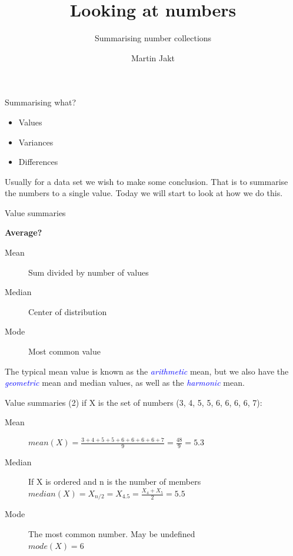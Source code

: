 \documentclass[pdf]{beamer}
\title{Looking at numbers}
\subtitle{Summarising number collections}
\author{Martin Jakt}
\begin{document}
\begin{frame}
\titlepage
\end{frame}

\begin{frame}{Summarising what?}
  \begin{itemize}
  \item Values
  \item Variances
  \item Differences
  \end{itemize}

  Usually for a data set we wish to make some conclusion. That is to
  summarise the numbers to a single value. Today we will start to look
  at how we do this.
\end{frame}

\begin{frame}{Value summaries}

{
\bfseries{Average?}
}

\begin{description}
\item[Mean] \pause Sum divided by number of values
\item[Median] \pause Center of distribution
\item[Mode] \pause Most common value
\end{description}

\pause
The typical mean value is known as the \textcolor{blue}{\emph{arithmetic}} mean,
but we also have the \textcolor{blue}{\emph{geometric}} mean and median values,
as well as the \textcolor{blue}{\emph{harmonic}} mean.

\end{frame}

\begin{frame}{Value summaries (2)}
  if X is the set of numbers (3, 4, 5, 5, 6, 6, 6, 6, 7):

  \small
  \begin{description}
  \item[Mean] 
    $ mean(X) = \frac{3 + 4 + 5 + 5 + 6 + 6 + 6 + 6 + 7}{9} = \frac{48}{9} = 5.3 $
  \item[Median] If X is ordered and n is the number of members\\
    $ median(X) = X_{n/2} = X_{4.5} = \frac{X_4 + X_5}{2} = 5.5 $
  \item[Mode] The most common number. May be undefined\\
    $ mode(X) = 6 $
  \end{description}
\end{frame}
\end{document}
